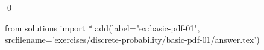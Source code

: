 
\begin{ex} 
  \label{ex:basic-pdf-01}
  
  \qed
\end{ex} 
\begin{python0}
from solutions import *
add(label="ex:basic-pdf-01",
    srcfilename='exercises/discrete-probability/basic-pdf-01/answer.tex') 
\end{python0}
